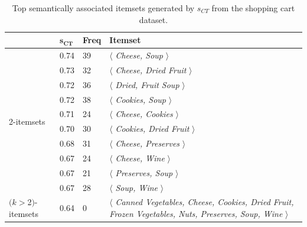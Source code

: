 \begin{table}
\begin{center}
\begin{tabular}{l|l | l | l }
  \hline
&$\mathbf{s_{CT}}$       &\textbf{Freq}&   \textbf{Itemset}\\
  \hline\hline
\multirow{10}{*}{2-itemsets}& 0.74	&	39	&$\langle$\emph{	Cheese,	Soup	}$\rangle$\\
&0.73	&	32	&$\langle$\emph{	Cheese,	Dried Fruit	}$\rangle$\\
&0.72	&	36	&$\langle$\emph{	Dried, Fruit	Soup	}$\rangle$\\
&0.72	&	38	&$\langle$\emph{	Cookies,	Soup	}$\rangle$\\
&0.71	&	24	&$\langle$\emph{	Cheese,	Cookies	}$\rangle$\\
&0.70	&	30	&$\langle$\emph{	Cookies,	Dried Fruit	}$\rangle$\\
&0.68	&	31	&$\langle$\emph{	Cheese,	Preserves	}$\rangle$\\
&0.67   &	24	&$\langle$\emph{	Cheese,	Wine	}$\rangle$\\
&0.67	&	21	&$\langle$\emph{	Preserves,	Soup	}$\rangle$\\
&0.67	&	28	&$\langle$\emph{	Soup,	Wine	}$\rangle$\\
\hline
\parbox{1cm}{$(k$$>$2$)$-itemsets}&0.64 &	0	&\parbox{6cm}{$\langle$\emph{ Canned Vegetables, Cheese, Cookies, Dried Fruit, Frozen Vegetables, Nuts, Preserves, Soup, Wine }$\rangle$}\\
  \hline
\end{tabular}
\end{center}
\caption[Top $s_{CT}$ results on the shopping cart dataset.]{\label{tbl:foodmart_ct} Top semantically associated itemsets generated by $s_{CT}$ from the shopping cart dataset.}
\end{table}

